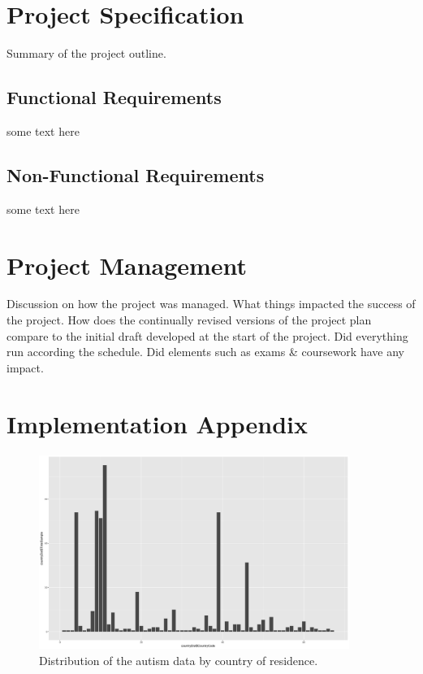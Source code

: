 \chapter{Project Specification}
Summary of the project outline.

\section{Functional Requirements}
some text here

\section{Non-Functional Requirements}
some text here

\chapter{Project Management}
Discussion on how the project was managed. What things impacted the success of the project. How does the continually revised versions of the project plan compare to the initial draft developed at the start of the project. Did everything run according the schedule. Did elements such as exams \& coursework have any impact. 

\chapter{Implementation Appendix}

\begin{figure}[!htbp]
    \centering
    \includegraphics[width=0.9\textwidth]{ThesisTemplate/appendix/images/figure4_2b.png}
    \caption{Distribution of the autism data by country of residence.}
    \label{fig:my_label}
\end{figure}

